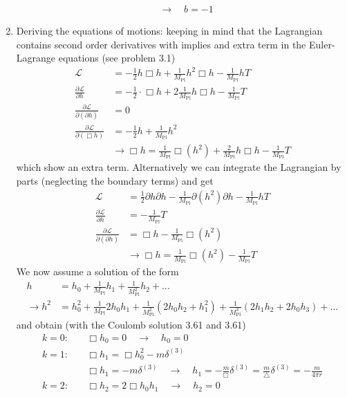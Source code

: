 \documentclass[10pt,a4paper]{article}
\theoremstyle{definition}
\begin{document}
\begin{enumerate}[label=(\alph*)]
\begin{align}
&\rightarrow\quad b=-1
\end{align} 
\item Deriving the equations of motions: keeping in mind that the Lagrangian contains second order derivatives with implies and extra term in the Euler-Lagrange equations (see problem 3.1)
\begin{align}
\mathcal{L}&=-\frac{1}{2}h\Box h+\frac{1}{M_\text{Pl}}h^2\Box h-\frac{1}{M_\text{Pl}}hT\\
\frac{\partial\mathcal{L}}{\partial h}&=-\frac{1}{2}\cdot\Box h+2\frac{1}{M_\text{Pl}}h\Box h-\frac{1}{M_\text{Pl}}T\\
\frac{\partial\mathcal{L}}{\partial(\partial h)}&=0\\
\frac{\partial\mathcal{L}}{\partial(\Box h)}&=-\frac{1}{2}h+\frac{1}{M_\text{Pl}}h^2\\
&\rightarrow\Box h=\frac{1}{M_\text{Pl}}\Box(h^2)+\frac{2}{M_\text{Pl}}h\Box h-\frac{1}{M_\text{Pl}}T
\end{align}
which show an extra term. Alternatively we can integrate the Lagrangian by parts (neglecting the boundary terms) and get
\begin{align}
\mathcal{L}&=\frac{1}{2}\partial h\partial h-\frac{1}{M_\text{Pl}}\partial(h^2)\partial h-\frac{1}{M_\text{Pl}}hT\\
\frac{\partial\mathcal{L}}{\partial h}&=-\frac{1}{M_\text{Pl}}T\\
\frac{\partial\mathcal{L}}{\partial(\partial h)}&=\Box h-\frac{1}{M_\text{Pl}}\Box(h^2)\\
&\rightarrow\Box h=\frac{1}{M_\text{Pl}}\Box(h^2)-\frac{1}{M_\text{Pl}}T
\end{align}
We now assume a solution of the form
\begin{align}
h&=h_0+\frac{1}{M_\text{Pl}}h_1+\frac{1}{M_\text{Pl}^2}h_2+...\\
\rightarrow h^2&=h_0^2+\frac{1}{M_\text{Pl}}2h_0h_1+\frac{1}{M_\text{Pl}^2}(2h_0h_2+h_1^2)+\frac{1}{M_\text{Pl}^3}(2h_1h_2+2h_0h_3)+...
\end{align}
and obtain (with the Coulomb solution 3.61 and 3.61)
\begin{align}
k=0:&\quad\Box h_0=0\quad\rightarrow\quad h_0=0\\
k=1:&\quad\Box h_1=\Box h_0^2-m\delta^{(3)}\\
    &\quad\Box h_1=-m\delta^{(3)}\quad\rightarrow\quad h_1=-\frac{m}{\Box}\delta^{(3)}=\frac{m}{\triangle}\delta^{(3)}=-\frac{m}{4\pi r}\\
k=2:&\quad\Box h_2=2\Box h_0h_1\quad\rightarrow\quad h_2=0\\

\end{align}
\end{enumerate}
\end{document}

